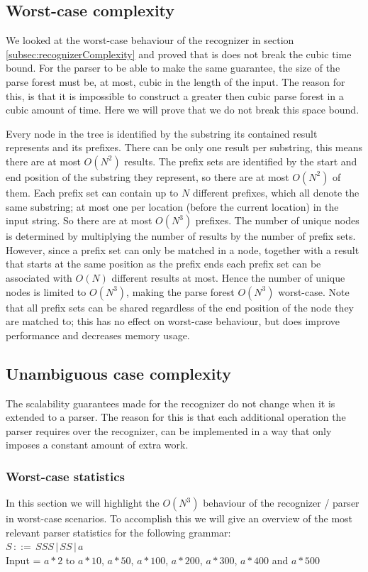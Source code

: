 \documentclass[a4paper,10pt]{article}
\begin{document}
\subsection{Worst-case complexity}

We looked at the worst-case behaviour of the recognizer in section \ref{subsec:recognizerComplexity} and proved that is does not break the cubic time bound. For the parser to be able to make the same guarantee, the size of the parse forest must be, at most, cubic in the length of the input. The reason for this, is that it is impossible to construct a greater then cubic parse forest in a cubic amount of time. Here we will prove that we do not break this space bound.

Every node in the tree is identified by the substring its contained result represents and its prefixes. There can be only one result per substring, this means there are at most $O(N^2)$ results. The prefix sets are identified by the start and end position of the substring they represent, so there are at most $O(N^2)$ of them. Each prefix set can contain up to $N$ different prefixes, which all denote the same substring; at most one per location (before the current location) in the input string. So there are at most $O(N^3)$ prefixes. The number of unique nodes is determined by multiplying the number of results by the number of prefix sets. However, since a prefix set can only be matched in a node, together with a result that starts at the same position as the prefix ends each prefix set can be associated with $O(N)$ different results at most. Hence the number of unique nodes is limited to $O(N^3)$, making the parse forest $O(N^3)$ worst-case. Note that all prefix sets can be shared regardless of the end position of the node they are matched to; this has no effect on worst-case behaviour, but does improve performance and decreases memory usage.

\subsection{Unambiguous case complexity}

The scalability guarantees made for the recognizer do not change when it is extended to a parser. The reason for this is that each additional operation the parser requires over the recognizer, can be implemented in a way that only imposes a constant amount of extra work.

\subsubsection{Worst-case statistics}
In this section we will highlight the $O(N^3)$ behaviour of the recognizer / parser in worst-case scenarios. To accomplish this we will give an overview of the most relevant parser statistics for the following grammar:\\
$S\,::=\,SSS\,|\,SS\,|\,a$\\
Input = $a * 2$ to $a * 10$, $a * 50$, $a * 100$, $a * 200$, $a * 300$, $a * 400$ and $a * 500$
\end{document}
